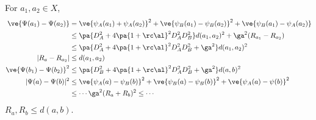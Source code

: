 For $a_1,a_2\in X$, 
\begin{align}
\ve{\Psi(a_1)- \Psi(a_2)} &=\ve{\psi_A(a_1) + \psi_A(a_2)}^2 + \ve{\psi_B(a_1)-\psi_B(a_2)}^2+ \ve{\psi_B(a_1)-\psi_A(a_2)}\\
&\le \pa{D_A^2 + 4\pa{1+\rc\al}^2 D_A^2D_B^2}d(a_1,a_2)^2 + \ga^2(R_{a_1} - R_{a_2})\\
&\le \pa{D_A^2 + 4\pa{1+\rc\al}^2 D_A^2D_B^2+\ga^2}d(a_1,a_2)^2\\
|R_a-R_{a_2}|&\le d(a_1,a_2)\\
\ve{\Psi(b_1)-\Psi(b_2)}^2 &\le \pa{D_B^2 + 4\pa{1+\rc\al}^2 D_A^2D_B^2 + \ga^2} d(a,b)^2\\
|\Psi(a)-\Psi(b)|^2 & \le \ve{\psi_A(a)-\psi_B(b)}^2 + \ve{\psi_B(a)-\psi_B(b)}^2 + \ve{\psi_A(a)-\psi(b)}^2\\
&\le \cdots \ga^2(R_a+R_b)^2 \le\cdots
\end{align}
$R_a,R_b\le d(a,b)$.




